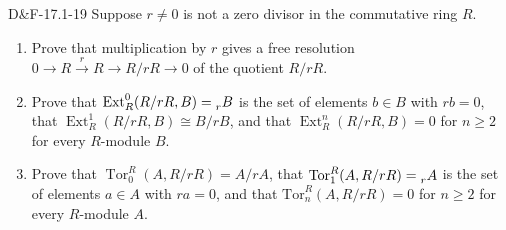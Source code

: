 \documentclass{article}
\newcommand{\tor}{\text{Tor}}
\begin{document}
	\begin{prb}{D\&F-17.1-19}
		Suppose $r \neq 0$ is not a zero divisor in the commutative ring $R$. \vspace{-0.25cm}
		\begin{enumerate}[itemsep =-2pt,label = \textbf{(\alph{*})}]
			\item Prove that multiplication by $r$ gives a free resolution $0 \to R \xrightarrow{r} R \to R/rR \to 0$ of the quotient $R/rR$. 
			\item Prove that $\operatorname{Ext}_{R}^{0}(R/rR, B) = \prescript{}{r}{B}$ is the set of elements $b \in B$ with $rb = 0$, that $\operatorname{Ext}_{R}^{1}(R/rR, B) \cong B/rB$, and that $\operatorname{Ext}_{R}^{n}(R/rR, B) = 0$ for $n\geq 2$ for every $R$-module $B$. 
			\item Prove that $\operatorname{Tor}_{0}^{R}(A, R/rR) = A/rA$, that $\tor_{1}^{R}(A, R/rR) = \prescript{}{r}{A}$ is the set of elements $a \in A$ with $ra = 0$, and that $\tor_{n}^{R}(A, R/rR) = 0$ for $n\geq 2$ for every $R$-module $A$.
		\end{enumerate}
	\end{prb}
	
\end{document}
